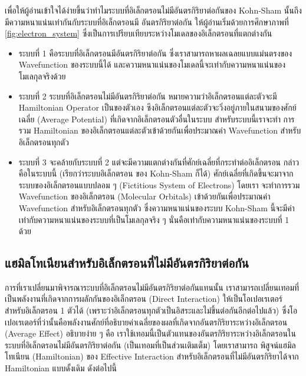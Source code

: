 เพื่อให้ผู้อ่านเข้าใจได้ง่ายขึ้นว่าทำไมระบบที่อิเล็กตรอนไม่มีอันตรกิริยาต่อกันของ Kohn-Sham นั้นถึงมีความหนาแน่นเท่ากันกับระบบที่อิเล็กตรอนมี%
อันตรกิริยาต่อกัน ให้ผู้อ่านเริ่มด้วยการศึกษาภาพที่ \ref{fig:electron_system} ซึ่งเป็นการเปรียบเทียบระหว่างโมเดลของอิเล็กตรอนที่แตกต่างกัน

\begin{itemize}[topsep=0pt]
    \item ระบบที่ 1 คือระบบที่อิเล็กตรอนมีอันตรกิริยาต่อกัน ซึ่งเราสามารถหาผลเฉลยแบบแม่นตรงของ Wavefunction ของระบบนี้ได้ 
    และความหนาแน่นของโมเดลนี้จะเท่ากับความหนาแน่นของโมเลกุลจริงด้วย

    \item ระบบที่ 2 ระบบที่อิเล็กตรอนไม่มีอันตรกิริยาต่อกัน หมายความว่าอิเล็กตรอนแต่ละตัวจะมี Hamiltonian Operator เป็นของตัวเอง 
    ซึงอิเล็กตรอนแต่ละตัวจะวิ่งอยู่ภายในสนามของศักย์เฉลี่ย (Average Potential) ที่เกิดจากอิเล็กตรอนตัวอื่นในระบบ สำหรับระบบนี้เราจะทำ%
    การรวม Hamiltonian ของอิเล็กตรอนแต่ละตัวเข้าด้วยกันเพื่อประมาณค่า Wavefunction สำหรับอิเล็กตรอนทุกตัว

    \item ระบบที่ 3 จะคล้ายกับระบบที่ 2 แต่จะมีความแตกต่างกันที่ศักย์เฉลี่ยที่กระทำต่ออิเล็กตรอน กล่าวคือในระบบนี้ (เรียกว่าระบบอิเล็กตรอน 
    ของ Kohn-Sham ก็ได้) ศักย์เฉลี่ยที่เกิดขึ้นจะมาจากระบบของอิเล็กตรอนแบบปลอม ๆ (Fictitious System of Electrons) โดยเรา%
    จะทำการรวม Wavefunction ของอิเล็กตรอน (Molecular Orbitals) เข้าด้วยกันเพื่อประมาณค่า Wavefunction สำหรับอิเล็กตรอนทุกตัว
    ซึ่งความหนาแน่นของระบบ Kohn-Sham นี้จะมีค่าเท่ากับความหนาแน่นของระบบที่เป็นโมเลกุลจริง ๆ นั่นคือเท่ากับความหนาแน่นของระบบที่ 1 
    ด้วย
\end{itemize}

\subsection{แฮมิลโทเนียนสำหรับอิเล็กตรอนที่ไม่มีอันตรกิริยาต่อกัน}
\label{ssec:hamil_noninter_elec}

การที่เราเปลี่ยนมาพิจารณาระบบที่อิเล็กตรอนไม่มีอันตรกิริยาต่อกันแทนนั้น เราสามารถเปลี่ยนเทอมที่เป็นพลังงานที่เกิดจากการผลักกันของอิเล็กตรอน 
(Direct Interaction) ให้เป็นโอเปอเรเตอร์สำหรับอิเล็กตรอน 1 ตัวได้ (เพราะว่าอิเล็กตรอนทุกตัวเป็นอิสระและไม่ขึ้นต่อกันอีกต่อไปแล้ว) 
ซึ่งโอเปอเรเตอร์ที่ว่านั้นคือพลังงานศักย์ที่อธิบายค่าเฉลี่ยของผลที่เกิดจากอันตรกิริยาระหว่างอิเล็กตรอน (Average Effect) อธิบายง่าย ๆ คือ%
เราใช้เทอมนี้เป็นตัวแทนของอันตรกิริยาระหว่างอิเล็กตรอนในระบบที่อิเล็กตรอนไม่มีอันตรกิริยาต่อกัน (เป็นเทอมที่เป็นส่วนเติมเต็ม) โดยเราสามารถ%
พิสูจน์แฮมิลโทเนียน (Hamiltonian) ของ Effective Interaction สำหรับอิเล็กตรอนที่ไม่มีอันตรกิริยาได้จาก Hamiltonian แบบดั้งเดิม 
ดังต่อไปนี้

